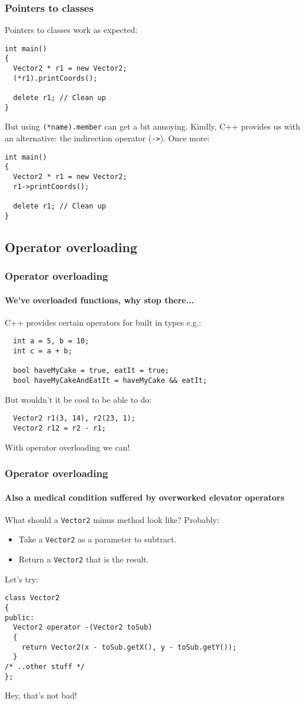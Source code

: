 \documentclass{beamer}
\begin{document}
\begin{frame}[fragile]
  \frametitle{Pointers to classes}
  
  Pointers to classes work as expected:
  \begin{lstlisting}
int main()
{
  Vector2 * r1 = new Vector2;
  (*r1).printCoords();
  
  delete r1; // Clean up
}
  \end{lstlisting}
  \pause
  But using \texttt{(*name).member} can get a bit annoying.  Kindly, C++ provides us with an alternative: the indirection operator (\texttt{->}).\pause{}  Once more:
  \begin{lstlisting}
int main()
{
  Vector2 * r1 = new Vector2;
  r1->printCoords();
  
  delete r1; // Clean up
}  
  \end{lstlisting}

\end{frame}

\subsection{Operator overloading}

\begin{frame}[fragile]
  \frametitle{Operator overloading}
  \framesubtitle{We've overloaded functions, why stop there...}
  
  C++ provides certain operators for built in types e.g.:
  \begin{lstlisting}
  int a = 5, b = 10;
  int c = a + b;
  
  bool haveMyCake = true, eatIt = true;
  bool haveMyCakeAndEatIt = haveMyCake && eatIt;
  \end{lstlisting}
  But wouldn't it be cool to be able to do:
  \begin{lstlisting}
  Vector2 r1(3, 14), r2(23, 1);
  Vector2 r12 = r2 - r1;
  \end{lstlisting}
  With operator overloading we can!

\end{frame}

\begin{frame}[fragile]
  \frametitle{Operator overloading}
  \framesubtitle{Also a medical condition suffered by overworked elevator operators}
  
  What should a \texttt{Vector2} minus method look like?  Probably:
  \begin{itemize}
    \item{Take a \texttt{Vector2} as a parameter to subtract.}
    \pause
    \item{Return a \texttt{Vector2} that is the result.}
  \end{itemize}
  \pause
  Let's try:
  \begin{lstlisting}
class Vector2
{
public:
  Vector2 operator -(Vector2 toSub)
  {
    return Vector2(x - toSub.getX(), y - toSub.getY());
  } 
/* ..other stuff */
};
  \end{lstlisting}
  Hey, that's not bad!
  
\end{frame}
\end{document}
